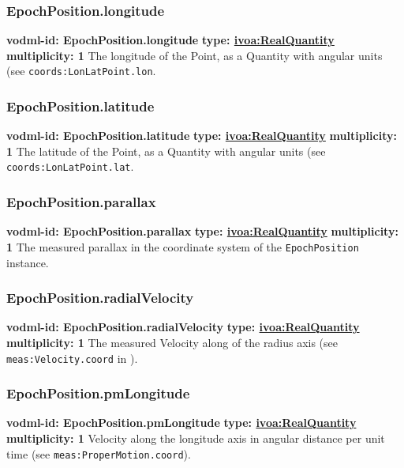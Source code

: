     \subsubsection{EpochPosition.longitude}
    \textbf{vodml-id: EpochPosition.longitude} \newline
    \textbf{type: \hyperref[sect:ivoa]{ivoa:RealQuantity}} \newline
    \textbf{multiplicity: 1} \newline
    The longitude of the Point, as a Quantity with angular units (see \texttt{coords:LonLatPoint.lon}.

    \subsubsection{EpochPosition.latitude}
    \textbf{vodml-id: EpochPosition.latitude} \newline
    \textbf{type: \hyperref[sect:ivoa]{ivoa:RealQuantity}} \newline
    \textbf{multiplicity: 1} \newline
    The latitude of the Point, as a Quantity with angular units (see \texttt{coords:LonLatPoint.lat}.

    \subsubsection{EpochPosition.parallax}
    \textbf{vodml-id: EpochPosition.parallax} \newline
    \textbf{type: \hyperref[sect:ivoa]{ivoa:RealQuantity}} \newline
    \textbf{multiplicity: 1} \newline
    The measured parallax in the coordinate system of the \texttt{EpochPosition} instance.

    \subsubsection{EpochPosition.radialVelocity}
    \textbf{vodml-id: EpochPosition.radialVelocity} \newline
    \textbf{type: \hyperref[sect:ivoa]{ivoa:RealQuantity}} \newline
    \textbf{multiplicity: 1} \newline
    The measured Velocity along of the radius axis (see \texttt{meas:Velocity.coord} in \cite{2022ivoa.spec.1004R}).

    \subsubsection{EpochPosition.pmLongitude}
    \textbf{vodml-id: EpochPosition.pmLongitude} \newline
    \textbf{type: \hyperref[sect:ivoa]{ivoa:RealQuantity}} \newline
    \textbf{multiplicity: 1} \newline
    Velocity along the longitude axis in angular distance per unit time (see \texttt{meas:ProperMotion.coord}).

